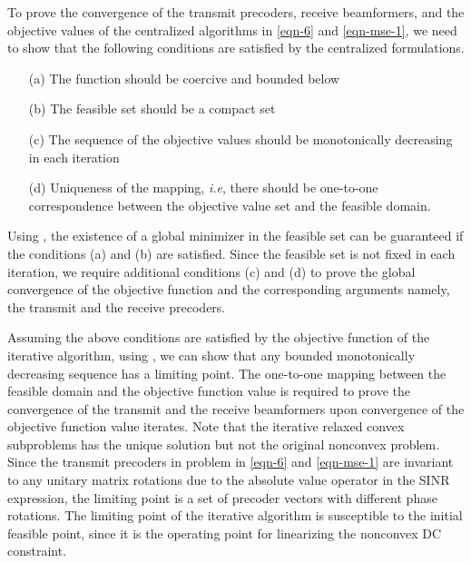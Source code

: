 \newcommand{\eqn}[1]{\(#1\)}
\newcommand{\mx}{\mbf{m}}
\newcommand{\my}{\mbf{w}}
\newcommand{\mz}{\mbfa{\gamma}}
\newcommand{\mxb}{{{\mbf{m}}}}
\newcommand{\myb}{{{\mbf{w}}}}
\newcommand{\iterate}[2]{{#1}^{(#2)}}
\newcommand{\iter}[3]{{#1}_{#2}^{(#3)}}

To prove the convergence of the transmit precoders, receive beamformers, and the objective values of the centralized algorithms in \eqref{eqn-6} and \eqref{eqn-mse-1}, we need to show that the following conditions are satisfied by the centralized formulations.
\begin{itemize}
	\item[(a)] The function should be coercive and bounded below
	\item[(b)] The feasible set should be a compact set
	\item[(c)] The sequence of the objective values should be monotonically decreasing in each iteration
	\item[(d)] Uniqueness of the mapping, \textit{i.e}, there should be one-to-one correspondence between the objective value set and the feasible domain.
\end{itemize}
Using \cite[Prop. A.8]{bertsekas1999nonlinear}, the existence of a global minimizer in the feasible set can be guaranteed if the conditions (a) and (b) are satisfied. Since the feasible set is not fixed in each iteration, we require additional conditions (c) and (d) to prove the global convergence of the objective function and the corresponding arguments namely, the transmit and the receive precoders. 

Assuming the above conditions are satisfied by the objective function of the iterative algorithm, using \cite[Th. 3.14]{rudin1964principles}, we can show that any bounded monotonically decreasing sequence has a limiting point. The one-to-one mapping between the feasible domain and the objective function value is required to prove the convergence of the transmit and the receive beamformers upon convergence of the objective function value iterates. Note that the iterative relaxed convex subproblems has the unique solution but not the original nonconvex problem. Since the transmit precoders in problem in \eqref{eqn-6} and \eqref{eqn-mse-1} are invariant to any unitary matrix rotations due to the absolute value operator in the \ac{SINR} expression, the limiting point is a set of precoder vectors with different phase rotations. The limiting point of the iterative algorithm is susceptible to the initial feasible point, since it is the operating point for linearizing the nonconvex \ac{DC} constraint.


